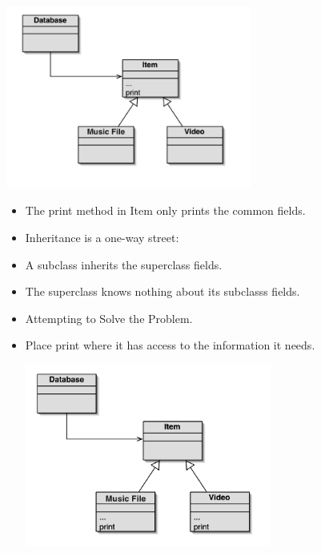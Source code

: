 \documentclass{beamer}
\begin{document}
\begin{frame}
\begin{center}
\includegraphics[height=6cm, keepaspectratio]{images/poly}
\end{center}
\end{frame}

\begin{frame}
\begin{itemize}
\item The print method in Item only prints the common fields.
\item Inheritance is a one-way street:
\bigskip
\item A subclass inherits the superclass fields.
\item The superclass knows nothing about its subclasss fields.
\end{itemize}
\end{frame}

\begin{frame}
\begin{itemize}
\item Attempting to Solve the Problem.
\bigskip
\item Place print where it has access to the information it needs.
\begin{center}
\includegraphics[height=6cm, keepaspectratio]{images/poly2}
\end{center}
\end{itemize}
\end{frame}
\end{document}
